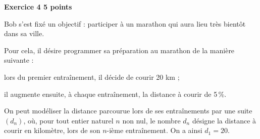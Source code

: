 \textbf{\large Exercice 4 \hfill 5 points}

\bigskip

Bob s'est fixé un objectif : participer à un marathon qui aura lieu très bientôt dans sa ville.

Pour cela, il désire programmer sa préparation au marathon de la manière suivante :

\begin{list}{\textbullet}{}
\item lors du premier entraînement, il décide de courir 20 km ;
\item il augmente ensuite, à chaque entraînement, la distance à courir de 5\,\%.
\end{list}

On peut modéliser la distance parcourue lors de ses entraînements par une suite $(d_n)$, où, pour tout entier naturel $n$ non nul, le nombre $d_n$ désigne la distance à courir en kilomètre, lors de son $n$-ième entraînement.
On a ainsi $d_1 = 20$.

